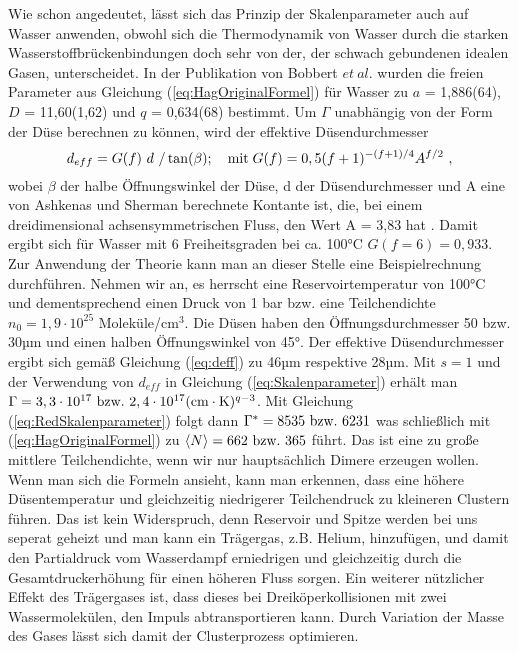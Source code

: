 Wie schon angedeutet, lässt sich das Prinzip der Skalenparameter auch auf Wasser anwenden, obwohl sich die Thermodynamik von Wasser durch die starken Wasserstoffbrückenbindungen doch sehr von der, der schwach gebundenen idealen Gasen, unterscheidet. In der Publikation von Bobbert $et\ al.$ \cite{bobbert2002} wurden die freien Parameter aus Gleichung (\ref{eq:HagOriginalFormel}) für Wasser zu $a$ = 1,886(64), $D$ = 11,60(1,62) und $q$ = 0,634(68) bestimmt. Um $\Gamma$ unabhängig von der Form der Düse berechnen zu können, wird der effektive Düsendurchmesser
%
\begin{equation} \label{eq:deff}
d_{eff} = G(f)\ d\ /\tan(\beta); \quad \textmd{mit} \; G(f)= 0,5 (f+1)^{-(f+1)/4} A^{f/2} \ ,
\end{equation}
%
wobei $\beta$ der halbe Öffnungswinkel der Düse, d der Düsendurchmesser und A eine von Ashkenas und Sherman berechnete Kontante ist, die, bei einem dreidimensional achsensymmetrischen Fluss, den Wert A = 3,83 hat \cite{bobbert2002}. Damit ergibt sich für Wasser mit 6 Freiheitsgraden bei ca. 100°C $G(f=6)=0,933$. 
Zur Anwendung der Theorie kann man an dieser Stelle eine Beispielrechnung durchführen. Nehmen wir an, es herrscht eine Reservoirtemperatur von 100°C und dementsprechend einen Druck von 1 bar bzw. eine Teilchendichte $n_0 = 1,9 \cdot 10^{25}$ Moleküle/cm$^{3}$. Die Düsen haben den Öffnungsdurchmesser 50 bzw. 30µm und einen halben Öffnungswinkel von 45°. Der effektive Düsendurchmesser ergibt sich gemäß Gleichung (\ref{eq:deff}) zu 46µm respektive 28µm. Mit $s = 1$ und der Verwendung von $d_{eff}$ in Gleichung (\ref{eq:Skalenparameter}) erhält man $\Gamma = 3,3 \cdot 10^{17}\ \textmd{bzw.} \ 2,4 \cdot 10^{17} (\mathrm{cm}\cdot \mathrm{K})^{q-3}$. Mit Gleichung (\ref{eq:RedSkalenparameter}) folgt dann $\Gamma^* = 8535\ \textmd{bzw.}\ 6231$ was schließlich mit (\ref{eq:HagOriginalFormel}) zu $\left\langle N \right\rangle = 662\ \textmd{bzw.} \ 365$ führt.
Das ist eine zu große mittlere Teilchendichte, wenn wir nur hauptsächlich Dimere erzeugen wollen. Wenn man sich die Formeln ansieht, kann man erkennen, dass eine höhere Düsentemperatur und gleichzeitig niedrigerer Teilchendruck zu kleineren Clustern führen. Das ist kein Widerspruch, denn Reservoir und Spitze werden bei uns seperat geheizt und man kann ein Trägergas, z.B. Helium, hinzufügen, und damit den Partialdruck vom Wasserdampf erniedrigen und gleichzeitig durch die Gesamtdruckerhöhung für einen höheren Fluss sorgen. Ein weiterer nützlicher Effekt des Trägergases ist, dass dieses bei Dreiköperkollisionen mit zwei Wassermolekülen, den Impuls abtransportieren kann. Durch Variation der Masse des Gases lässt sich damit der Clusterprozess optimieren.
